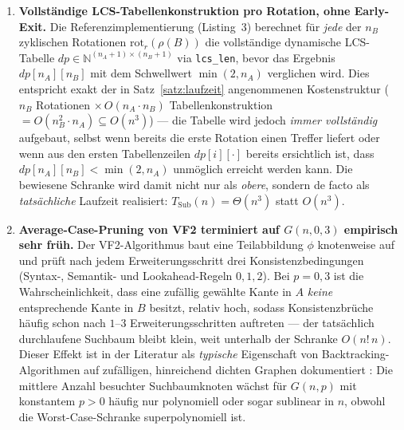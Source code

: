 \documentclass[a4paper,12pt, twoside]{report}
\theoremstyle{definition}
\begin{document}
\begin{enumerate}
	\item \textbf{Vollständige LCS-Tabellenkonstruktion pro Rotation, ohne Early-Exit.} Die Referenzimplementierung (Listing~3) berechnet für \emph{jede} der $n_B$ zyklischen Rotationen $\mathrm{rot}_r(\rho(B))$ die vollständige dynamische LCS-Tabelle $dp\in\mathbb{N}^{(n_A+1)\times(n_B+1)}$ via \texttt{lcs\_len}, bevor das Ergebnis $dp[n_A][n_B]$ mit dem Schwellwert $\min(2,n_A)$ verglichen wird. Dies entspricht exakt der in Satz~\ref{satz:laufzeit} angenommenen Kostenstruktur ($n_B$ Rotationen $\times\, O(n_A\cdot n_B)$ Tabellenkonstruktion $=O(n_B^2\cdot n_A)\subseteq O(n^3)$) — die Tabelle wird jedoch \emph{immer vollständig} aufgebaut, selbst wenn bereits die erste Rotation einen Treffer liefert oder wenn aus den ersten Tabellenzeilen $dp[i][\cdot]$ bereits ersichtlich ist, dass $dp[n_A][n_B] < \min(2,n_A)$ unmöglich erreicht werden kann. Die bewiesene Schranke wird damit nicht nur als \emph{obere}, sondern de facto als \emph{tatsächliche} Laufzeit realisiert: $T_{\text{Sub}}(n)=\Theta(n^3)$ statt $O(n^3)$.

	\item \textbf{Average-Case-Pruning von VF2 terminiert auf $G(n,0{,}3)$ empirisch sehr früh.} Der VF2-Algorithmus \cite{cordella2004} baut eine Teilabbildung $\phi$ knotenweise auf und prüft nach jedem Erweiterungsschritt drei Konsistenzbedingungen (Syntax-, Semantik- und Lookahead-Regeln $0,1,2$). Bei $p=0{,}3$ ist die Wahrscheinlichkeit, dass eine zufällig gewählte Kante in $A$ \emph{keine} entsprechende Kante in $B$ besitzt, relativ hoch, sodass Konsistenzbrüche häufig schon nach $1$--$3$ Erweiterungsschritten auftreten — der tatsächlich durchlaufene Suchbaum bleibt klein, weit unterhalb der Schranke $O(n!\,n)$. Dieser Effekt ist in der Literatur als \emph{typische} Eigenschaft von Backtracking-Algorithmen auf zufälligen, hinreichend dichten Graphen dokumentiert \cite{he2008,bonnici2013}: Die mittlere Anzahl besuchter Suchbaumknoten wächst für $G(n,p)$ mit konstantem $p>0$ häufig nur polynomiell oder sogar sublinear in $n$, obwohl die Worst-Case-Schranke superpolynomiell ist.


\end{enumerate}
\end{document}
